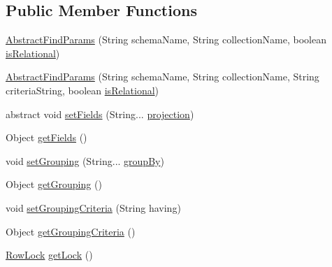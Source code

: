 \subsection*{Public Member Functions}
\begin{DoxyCompactItemize}
\item 
\mbox{\hyperlink{classcom_1_1mysql_1_1cj_1_1xdevapi_1_1_abstract_find_params_a1a25b8361fcaa3bb7b30a1a3f5fa51f7}{Abstract\+Find\+Params}} (String schema\+Name, String collection\+Name, boolean \mbox{\hyperlink{classcom_1_1mysql_1_1cj_1_1xdevapi_1_1_filter_params_a0224c120aec3648050bdf39abf891859}{is\+Relational}})
\item 
\mbox{\hyperlink{classcom_1_1mysql_1_1cj_1_1xdevapi_1_1_abstract_find_params_a77a35f3333221318a073b1f52faee04f}{Abstract\+Find\+Params}} (String schema\+Name, String collection\+Name, String criteria\+String, boolean \mbox{\hyperlink{classcom_1_1mysql_1_1cj_1_1xdevapi_1_1_filter_params_a0224c120aec3648050bdf39abf891859}{is\+Relational}})
\item 
abstract void \mbox{\hyperlink{classcom_1_1mysql_1_1cj_1_1xdevapi_1_1_abstract_find_params_a65e9b75d89ac2fa9d13280bcba7404f3}{set\+Fields}} (String... \mbox{\hyperlink{classcom_1_1mysql_1_1cj_1_1xdevapi_1_1_abstract_find_params_aa2f21464c6948fd8938d5663b997a18a}{projection}})
\item 
Object \mbox{\hyperlink{classcom_1_1mysql_1_1cj_1_1xdevapi_1_1_abstract_find_params_aec128ea6b15a2530e3bfb119bab740dc}{get\+Fields}} ()
\item 
void \mbox{\hyperlink{classcom_1_1mysql_1_1cj_1_1xdevapi_1_1_abstract_find_params_a073faf8afae62dea57a7af9dd31988e8}{set\+Grouping}} (String... \mbox{\hyperlink{classcom_1_1mysql_1_1cj_1_1xdevapi_1_1_abstract_find_params_af3bcff376fbbd9c8844219fb37404547}{group\+By}})
\item 
Object \mbox{\hyperlink{classcom_1_1mysql_1_1cj_1_1xdevapi_1_1_abstract_find_params_a5b322e19422e65c1e08db87b16ce77f0}{get\+Grouping}} ()
\item 
void \mbox{\hyperlink{classcom_1_1mysql_1_1cj_1_1xdevapi_1_1_abstract_find_params_a8e7b9f8acb811c6da58817a5d09e0444}{set\+Grouping\+Criteria}} (String having)
\item 
Object \mbox{\hyperlink{classcom_1_1mysql_1_1cj_1_1xdevapi_1_1_abstract_find_params_a3c3efcc6eb2e92825829e0f0e79b3a4b}{get\+Grouping\+Criteria}} ()
\item 
\mbox{\hyperlink{enumcom_1_1mysql_1_1cj_1_1xdevapi_1_1_find_params_1_1_row_lock}{Row\+Lock}} \mbox{\hyperlink{classcom_1_1mysql_1_1cj_1_1xdevapi_1_1_abstract_find_params_ab7fd8c9c27d43e696a0c0bdfc207efba}{get\+Lock}} ()

\end{DoxyCompactItemize}
